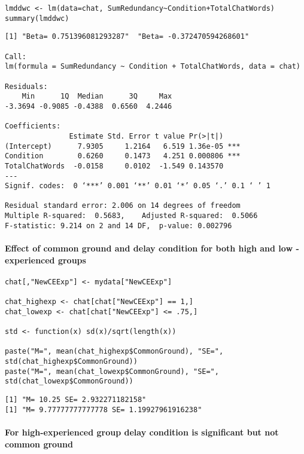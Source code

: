 \documentclass[10pt]{article}
\begin{document}
\begin{verbatim}
lmddwc <- lm(data=chat, SumRedundancy~Condition+TotalChatWords)
summary(lmddwc)
\end{verbatim}

\begin{verbatim}
[1] "Beta= 0.751396081293287"  "Beta= -0.372470594268601"

Call:
lm(formula = SumRedundancy ~ Condition + TotalChatWords, data = chat)

Residuals:
    Min      1Q  Median      3Q     Max 
-3.3694 -0.9085 -0.4388  0.6560  4.2446 

Coefficients:
               Estimate Std. Error t value Pr(>|t|)    
(Intercept)      7.9305     1.2164   6.519 1.36e-05 ***
Condition        0.6260     0.1473   4.251 0.000806 ***
TotalChatWords  -0.0158     0.0102  -1.549 0.143570    
---
Signif. codes:  0 ‘***’ 0.001 ‘**’ 0.01 ‘*’ 0.05 ‘.’ 0.1 ‘ ’ 1

Residual standard error: 2.006 on 14 degrees of freedom
Multiple R-squared:  0.5683,	Adjusted R-squared:  0.5066 
F-statistic: 9.214 on 2 and 14 DF,  p-value: 0.002796
\end{verbatim}


\paragraph*{Effect of common ground and delay condition for both high and low -experienced groups}
\label{sec-2-4-3-4}

\begin{verbatim}
chat[,"NewCEExp"] <- mydata["NewCEExp"]

chat_highexp <- chat[chat["NewCEExp"] == 1,]
chat_lowexp <- chat[chat["NewCEExp"] <= .75,]

std <- function(x) sd(x)/sqrt(length(x))

paste("M=", mean(chat_highexp$CommonGround), "SE=", std(chat_highexp$CommonGround))
paste("M=", mean(chat_lowexp$CommonGround), "SE=", std(chat_lowexp$CommonGround))
\end{verbatim}

\begin{verbatim}
[1] "M= 10.25 SE= 2.932271182158"
[1] "M= 9.77777777777778 SE= 1.19927961916238"
\end{verbatim}


\paragraph*{For high-experienced group delay condition is significant but not common ground}
\label{sec-2-4-3-5}
\end{document}
